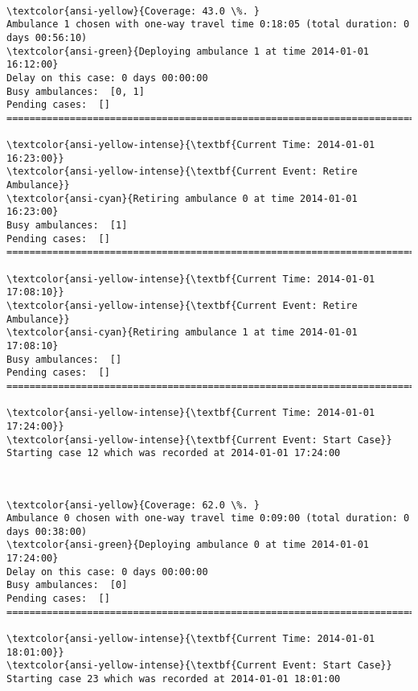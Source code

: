 \documentclass[11pt]{article}
\begin{document}
    \begin{center}
    \end{center}
    { \hspace*{\fill} \\}
    
    \begin{Verbatim}[commandchars=\\\{\}]
\textcolor{ansi-yellow}{Coverage: 43.0 \%. }
Ambulance 1 chosen with one-way travel time 0:18:05 (total duration: 0 days 00:56:10)
\textcolor{ansi-green}{Deploying ambulance 1 at time 2014-01-01 16:12:00}
Delay on this case: 0 days 00:00:00
Busy ambulances:  [0, 1]
Pending cases:  []
========================================================================

\textcolor{ansi-yellow-intense}{\textbf{Current Time: 2014-01-01 16:23:00}}
\textcolor{ansi-yellow-intense}{\textbf{Current Event: Retire Ambulance}}
\textcolor{ansi-cyan}{Retiring ambulance 0 at time 2014-01-01 16:23:00}
Busy ambulances:  [1]
Pending cases:  []
========================================================================

\textcolor{ansi-yellow-intense}{\textbf{Current Time: 2014-01-01 17:08:10}}
\textcolor{ansi-yellow-intense}{\textbf{Current Event: Retire Ambulance}}
\textcolor{ansi-cyan}{Retiring ambulance 1 at time 2014-01-01 17:08:10}
Busy ambulances:  []
Pending cases:  []
========================================================================

\textcolor{ansi-yellow-intense}{\textbf{Current Time: 2014-01-01 17:24:00}}
\textcolor{ansi-yellow-intense}{\textbf{Current Event: Start Case}}
Starting case 12 which was recorded at 2014-01-01 17:24:00

    \end{Verbatim}

    \begin{center}
    \end{center}
    { \hspace*{\fill} \\}
    
    \begin{Verbatim}[commandchars=\\\{\}]
\textcolor{ansi-yellow}{Coverage: 62.0 \%. }
Ambulance 0 chosen with one-way travel time 0:09:00 (total duration: 0 days 00:38:00)
\textcolor{ansi-green}{Deploying ambulance 0 at time 2014-01-01 17:24:00}
Delay on this case: 0 days 00:00:00
Busy ambulances:  [0]
Pending cases:  []
========================================================================

\textcolor{ansi-yellow-intense}{\textbf{Current Time: 2014-01-01 18:01:00}}
\textcolor{ansi-yellow-intense}{\textbf{Current Event: Start Case}}
Starting case 23 which was recorded at 2014-01-01 18:01:00

    \end{Verbatim}
\end{document}
